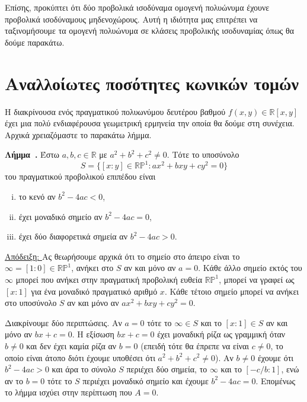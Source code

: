 \documentclass[12pt, a4paper]{book}
\newcounter{lemma}[section]
\newenvironment{lemma}[1][]{\refstepcounter{lemma}\par\medskip
   \textbf{Λήμμα~\thelemma. #1} \rmfamily}{\medskip}
\begin{document}
Επίσης, προκύπτει ότι δύο προβολικά ισοδύναμα ομογενή πολυώνυμα έχουνε προβολικά ισοδύναμους μηδενοχώρους. Αυτή η ιδιότητα μας επιτρέπει να ταξινομήσουμε τα ομογενή πολυώνυμα σε κλάσεις προβολικής ισοδυναμίας όπως θα δούμε παρακάτω.

\section{Αναλλοίωτες ποσότητες κωνικών τομών}

Η διακρίνουσα ενός πραγματικού πολυωνύμου δευτέρου βαθμού $f(x,y) \in \mathbb{R}[x,y]$ έχει μια πολύ ενδιαφέρουσα γεωμετρική ερμηνεία την οποία θα δούμε στη συνέχεια. Αρχικά χρειαζόμαστε το παρακάτω λήμμα.

\begin{lemma}
Έστω $a, b, c \in  \mathbb{R}$ με $a^2+b^2+c^2 \neq 0$. Τότε το υποσύνολο
\begin{displaymath}
S = \{[x:y] \in \mathbb{R}\mathbb{P}^1: ax^2+bxy+cy^2=0\}
\end{displaymath}
του πραγματικού προβολικού επιπέδου είναι
\begin{enumerate}[(i)]
\item το κενό αν $b^2-4ac < 0$,
\item έχει μοναδικό σημείο αν $b^2-4ac = 0$,
\item έχει δύο διαφορετικά σημεία αν $b^2-4ac > 0$.
\end{enumerate}
\end{lemma}

\underline{Απόδειξη: } 
Ας θεωρήσουμε αρχικά ότι το σημείο στο άπειρο είναι το $\infty = [1:0] \in \mathbb{R}\mathbb{P}^1$, ανήκει στο $S$ αν και μόνο αν $a = 0$. Κάθε άλλο σημείο εκτός του $\infty$ μπορεί που ανήκει στην πραγματική προβολική ευθεία $\mathbb{R}\mathbb{P}^1$, μπορεί να γραφεί ως $[x:1]$ για ένα μοναδικό πραγματικό αριθμό $x$. Κάθε τέτοιο σημείο μπορεί να ανήκει στο υποσύνολο $S$ αν και μόνο αν $ax^2+bxy+cy^2=0$.

Διακρίνουμε δύο περιπτώσεις. Αν $a=0$ τότε το $\infty \in S$ και το $[x:1] \in S$ αν και μόνο αν $bx+c=0$. Η εξίσωση $bx+c=0$ έχει μοναδική ρίζα ως γραμμική όταν $b \neq 0$ και δεν έχει καμία ρίζα αν $b = 0$ (επειδή τότε θα έπρεπε να είναι $c \neq 0$, το οποίο είναι άτοπο διότι έχουμε υποθέσει ότι  $a^2+b^2+c^2 \neq 0$). Αν $b \neq 0$ έχουμε ότι $b^2-4ac > 0$ και άρα το σύνολο $S$ περιέχει δύο σημεία, το $\infty$ και το $[-c/b:1]$, ενώ αν το $b =0$ τότε το $S$ περιέχει μοναδικό σημείο και έχουμε $b^2-4ac =0$. Επομένως το λήμμα ισχύει στην περίπτωση που $A =0$.
\end{document}
